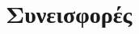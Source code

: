 \documentclass[a4paper,12pt]{article}
\begin{document}

\pagebreak


\section*{Συνεισφορές}
\end{document}
